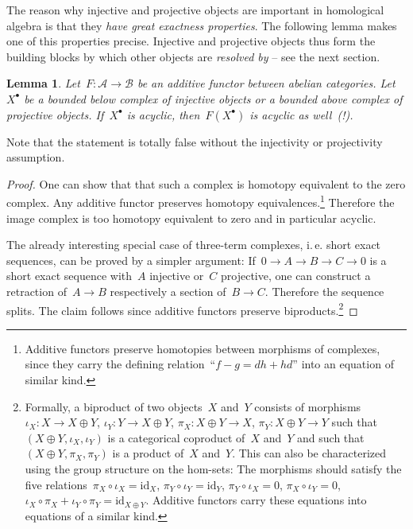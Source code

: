 \documentclass{amsart}
\makeatletter
\theoremstyle{definition}
\theoremstyle{plain}
\newtheorem{lemma}[defn]{Lemma}
\theoremstyle{remark}
\newcommand{\A}{\mathcal{A}}
\newcommand{\B}{\mathcal{B}}
\newcommand{\id}{\mathrm{id}}
\newcommand{\?}{\,{:}\,}
\renewcommand{\_}{\mathpunct{.}\,}
\newcommand{\ie}{i.\,e.\@\xspace}
\makeatother
\begin{document}
The reason why injective and projective objects are important in homological
algebra is that they \emph{have great exactness properties}. The following
lemma makes one of this properties precise. Injective and projective objects
thus form the building blocks by which other objects are \emph{resolved by} --
see the next section.

\begin{lemma}Let~$F : \A \to \B$ be an additive functor between abelian
categories. Let~$X^\bullet$ be a bounded below complex of injective objects or
a bounded above complex of projective objects. If~$X^\bullet$ is acyclic,
then~$F(X^\bullet)$ is acyclic as well~(!).\end{lemma}

Note that the statement is totally false without the injectivity or
projectivity assumption.

\begin{proof}One can show that that such a complex is homotopy equivalent to
the zero complex. Any additive functor preserves homotopy
equivalences.\footnote{Additive functors preserve homotopies between morphisms
of complexes, since they carry the defining relation~``$f-g = dh+hd$'' into an
equation of similar kind.}
Therefore the image complex is too homotopy equivalent to zero and in
particular acyclic.

The already interesting special case of three-term complexes, \ie short exact
sequences, can be proved by a simpler argument: If~$0 \to A \to B \to C \to 0$
is a short exact sequence with~$A$ injective or~$C$ projective, one can
construct a retraction of~$A \to B$ respectively a section of~$B \to C$.
Therefore the sequence splits. The claim follows since additive functors
preserve biproducts.\footnote{Formally, a biproduct of two objects~$X$ and~$Y$
consists of morphisms~$\iota_X : X \to X \oplus Y$, $\iota_Y :Y \to X \oplus
Y$, $\pi_X : X \oplus Y \to X$, $\pi_Y : X \oplus Y \to Y$ such that~$(X \oplus
Y, \iota_X, \iota_Y)$ is a categorical coproduct of~$X$ and~$Y$ and such
that~$(X \oplus Y, \pi_X, \pi_Y)$ is a product of~$X$ and~$Y$. This can also be
characterized using the group structure on the hom-sets: The morphisms should
satisfy the five relations~$\pi_X \circ \iota_X = \id_X$, $\pi_Y \circ \iota_Y
= \id_Y$, $\pi_Y \circ \iota_X = 0$, $\pi_X \circ \iota_Y = 0$, $\iota_X \circ
\pi_X + \iota_Y \circ \pi_Y = \id_{X \oplus Y}$. Additive functors carry these
equations into equations of a similar kind.}
\end{proof}
\end{document}
